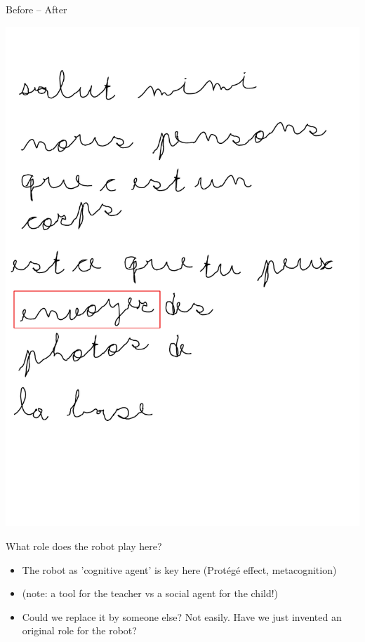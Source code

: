 \documentclass[compress]{beamer}
\begin{document}
\begin{frame}{Before -- After}
\begin{center}
{            \hspace{1cm}%
        \includegraphics[width=0.43\linewidth]{cowriter/lettre-final-highlight}
        }
    \end{center}
\end{frame}


\begin{frame}{What role does the robot play here?}
    \begin{itemize}
        \item<+-> The robot as 'cognitive agent' is key here (Protégé effect,
            metacognition)
        \item<+-> (note: a tool for the teacher vs a social agent for the child!)
        \item<+-> Could we replace it by someone else? Not easily. Have we
            just invented an original role for the robot?
    \end{itemize}
\end{frame}
\end{document}
